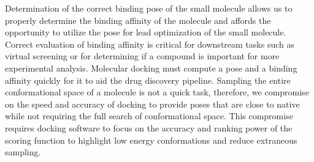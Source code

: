 \documentclass[journal=jcisd8,manuscript=article]{achemso}
\begin{document}
Determination of the correct binding pose of the small molecule allows us to properly determine the binding affinity of the molecule and affords the opportunity to utilize the pose for lead optimization of the small molecule. Correct evaluation of binding affinity is critical for downstream tasks such as virtual screening or for determining if a compound is important for more experimental analysis. Molecular docking must compute a pose and a binding affinity quickly for it to aid the drug discovery pipeline. Sampling the entire conformational space of a molecule is not a quick task, therefore, we compromise on the speed and accuracy of docking to provide poses that are close to native while not requiring the full search of conformational space. This compromise requires docking software to focus on the accuracy and ranking power of the scoring function to highlight low energy conformations and reduce extraneous sampling.
\end{document}
